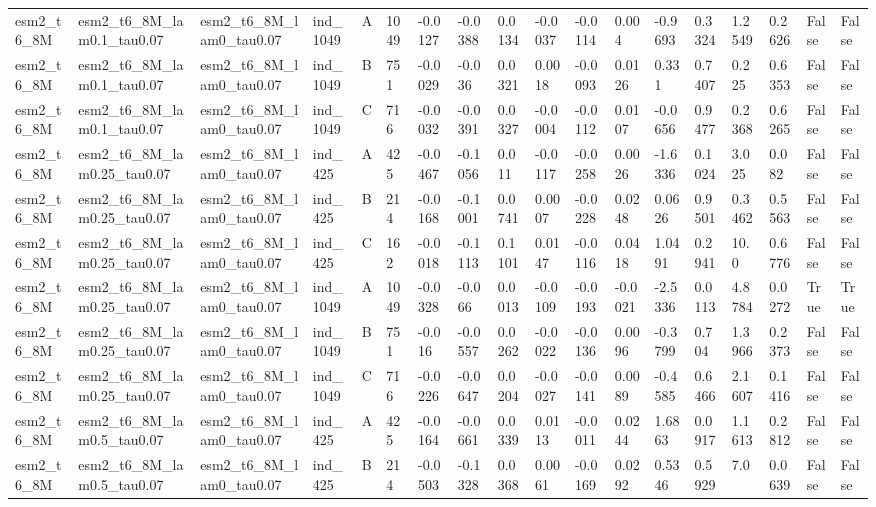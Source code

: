 \begin{table}[ht]
\begin{tabular}{llllllllllllllllll}
esm2\_t6\_8M & esm2\_t6\_8M\_lam0.1\_tau0.07 & esm2\_t6\_8M\_lam0\_tau0.07 & ind\_1049 & A & 1049 & -0.0127 & -0.0388 & 0.0134 & -0.0037 & -0.0114 & 0.004 & -0.9693 & 0.3324 & 1.2549 & 0.2626 & False & False \\
esm2\_t6\_8M & esm2\_t6\_8M\_lam0.1\_tau0.07 & esm2\_t6\_8M\_lam0\_tau0.07 & ind\_1049 & B & 751 & -0.0029 & -0.036 & 0.0321 & 0.0018 & -0.0093 & 0.0126 & 0.331 & 0.7407 & 0.225 & 0.6353 & False & False \\
esm2\_t6\_8M & esm2\_t6\_8M\_lam0.1\_tau0.07 & esm2\_t6\_8M\_lam0\_tau0.07 & ind\_1049 & C & 716 & -0.0032 & -0.0391 & 0.0327 & -0.0004 & -0.0112 & 0.0107 & -0.0656 & 0.9477 & 0.2368 & 0.6265 & False & False \\
esm2\_t6\_8M & esm2\_t6\_8M\_lam0.25\_tau0.07 & esm2\_t6\_8M\_lam0\_tau0.07 & ind\_425 & A & 425 & -0.0467 & -0.1056 & 0.011 & -0.0117 & -0.0258 & 0.0026 & -1.6336 & 0.1024 & 3.025 & 0.082 & False & False \\
esm2\_t6\_8M & esm2\_t6\_8M\_lam0.25\_tau0.07 & esm2\_t6\_8M\_lam0\_tau0.07 & ind\_425 & B & 214 & -0.0168 & -0.1001 & 0.0741 & 0.0007 & -0.0228 & 0.0248 & 0.0626 & 0.9501 & 0.3462 & 0.5563 & False & False \\
esm2\_t6\_8M & esm2\_t6\_8M\_lam0.25\_tau0.07 & esm2\_t6\_8M\_lam0\_tau0.07 & ind\_425 & C & 162 & -0.0018 & -0.1113 & 0.1101 & 0.0147 & -0.0116 & 0.0418 & 1.0491 & 0.2941 & 10.0 & 0.6776 & False & False \\
esm2\_t6\_8M & esm2\_t6\_8M\_lam0.25\_tau0.07 & esm2\_t6\_8M\_lam0\_tau0.07 & ind\_1049 & A & 1049 & -0.0328 & -0.066 & 0.0013 & -0.0109 & -0.0193 & -0.0021 & -2.5336 & 0.0113 & 4.8784 & 0.0272 & True & True \\
esm2\_t6\_8M & esm2\_t6\_8M\_lam0.25\_tau0.07 & esm2\_t6\_8M\_lam0\_tau0.07 & ind\_1049 & B & 751 & -0.016 & -0.0557 & 0.0262 & -0.0022 & -0.0136 & 0.0096 & -0.3799 & 0.704 & 1.3966 & 0.2373 & False & False \\
esm2\_t6\_8M & esm2\_t6\_8M\_lam0.25\_tau0.07 & esm2\_t6\_8M\_lam0\_tau0.07 & ind\_1049 & C & 716 & -0.0226 & -0.0647 & 0.0204 & -0.0027 & -0.0141 & 0.0089 & -0.4585 & 0.6466 & 2.1607 & 0.1416 & False & False \\
esm2\_t6\_8M & esm2\_t6\_8M\_lam0.5\_tau0.07 & esm2\_t6\_8M\_lam0\_tau0.07 & ind\_425 & A & 425 & -0.0164 & -0.0661 & 0.0339 & 0.0113 & -0.0011 & 0.0244 & 1.6863 & 0.0917 & 1.1613 & 0.2812 & False & False \\
esm2\_t6\_8M & esm2\_t6\_8M\_lam0.5\_tau0.07 & esm2\_t6\_8M\_lam0\_tau0.07 & ind\_425 & B & 214 & -0.0503 & -0.1328 & 0.0368 & 0.0061 & -0.0169 & 0.0292 & 0.5346 & 0.5929 & 7.0 & 0.0639 & False & False \\

\end{tabular}
\end{table}
